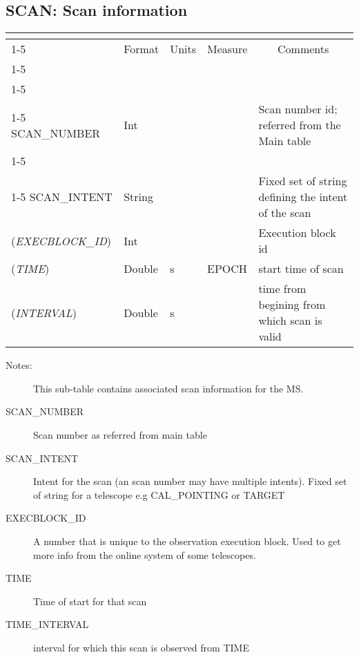 \documentclass{article}
\newcommand{\defline}[1]{\cline{1-5}
\multicolumn{5}{|l|}{#1} \\
\cline{1-5}}
\newcommand{\definetable}[3][]
{
  \vfill\newpage
  \subsection{#2}
  \label{tbl:#1}
  \vspace{0.15in}
  \small
  \begin{tabular}{|l|p{1.25in}|l|p{.9in}|p{1.4in}|}
  \hline
  \multicolumn{5}{|c|}{\bf #1}\\
  \cline{1-5}
  \multicolumn{1}{|c|}{Name}&\multicolumn{1}{|c|}{Format}&
  \multicolumn{1}{|c|}{Units}&\multicolumn{1}{|c|}{Measure}&
  \multicolumn{1}{|c|}{Comments}\\
  \cline{1-5}
  #3
  \hline
  \end{tabular}
}
\begin{document}
\definetable{SCAN: Scan information}{
\defline{\bf Columns}
\defline{\em Key}
SCAN\_NUMBER & Int &  &        & Scan number id; referred from the Main table\\

\defline{\em Data}
SCAN\_INTENT  & String &    &      & Fixed set of string defining the intent of the scan \\
({\it EXECBLOCK\_ID}) & Int & & & Execution block id\\
({\it TIME})   & Double & s & EPOCH & start time of scan\\
({\it INTERVAL})   & Double & s &  & time from begining from which scan is valid\\

}
\begin{description}

\item[Notes:] This sub-table contains associated scan information
for the MS.
\item[SCAN\_NUMBER] Scan number as referred from main table
\item[SCAN\_INTENT] Intent for the scan (an scan number may have multiple intents). Fixed set of string for a telescope e.g CAL\_POINTING or TARGET
\item[EXECBLOCK\_ID] A number that is unique to the observation execution block. Used to get more info from the online system of some telescopes.

\item[TIME]  Time of start for that scan

\item[TIME\_INTERVAL] interval for which this scan is observed from TIME

\end{description}
\end{document}
